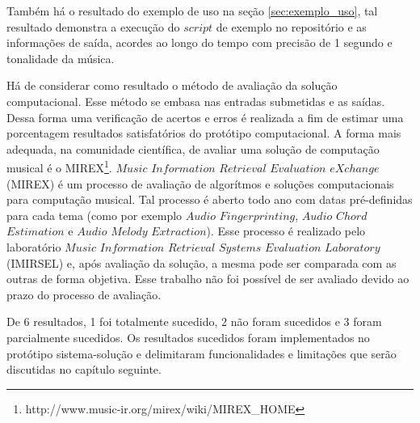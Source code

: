 Também há o resultado do exemplo de uso na seção \ref{sec:exemplo_uso}, tal resultado demonstra a execução do $script$ de exemplo no repositório e as informações de saída, acordes ao longo do tempo com precisão de 1 segundo e tonalidade da música.

Há de considerar como resultado o método de avaliação da solução computacional. Esse método se embasa nas entradas submetidas e as saídas. Dessa forma uma verificação de acertos e erros é realizada a fim de estimar uma porcentagem resultados satisfatórios do protótipo computacional. A forma mais adequada, na comunidade científica, de avaliar uma solução de computação musical é o MIREX\footnote{http://www.music-ir.org/mirex/wiki/MIREX\_HOME}. $Music$ $Information$ $Retrieval$ $Evaluation$ $eXchange$ (MIREX) é um processo de avaliação de algorítmos e soluções computacionais para computação musical. Tal processo é aberto todo ano com datas pré-definidas para cada tema (como por exemplo $Audio$ $Fingerprinting$, $Audio$ $Chord$ $Estimation$ e $Audio$ $Melody$ $Extraction$). Esse processo é realizado pelo laboratório $Music$ $Information$ $Retrieval$ $Systems$ $Evaluation$ $Laboratory$ (IMIRSEL) e, após avaliação da solução, a mesma pode ser comparada com as outras de forma objetiva. Esse trabalho não foi possível de ser avaliado devido ao prazo do processo de avaliação.

De 6 resultados, 1 foi totalmente sucedido, 2 não foram sucedidos e 3 foram parcialmente sucedidos. Os resultados sucedidos foram implementados no protótipo sistema-solução e delimitaram funcionalidades e limitações que serão discutidas no capítulo seguinte.
